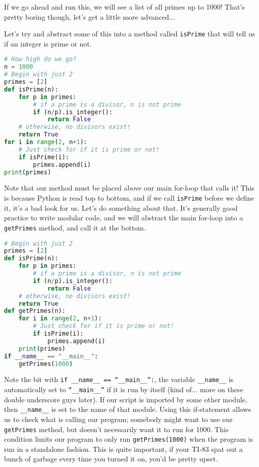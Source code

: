 \documentclass[11pt, twoside, reqno]{book}
\begin{document}
If we go ahead and run this, we will see a list of all primes up to 1000! That's pretty boring though, let's get a little more advanced...

Let's try and abstract some of this into a method called \texttt{isPrime} that will tell us if an integer is prime or not.
\begin{lstlisting}[language=Python]
# How high do we go?
n = 1000
# Begin with just 2
primes = [2]
def isPrime(n):
    for p in primes:
        # if a prime is a divisor, n is not prime
        if (n/p).is_integer():
            return False
    # otherwise, no divisors exist!
    return True
for i in range(2, n+1):
    # Just check for if it is prime or not!
    if isPrime(i):
        primes.append(i)
print(primes)
\end{lstlisting}

Note that our method must be placed above our main for-loop that calls it! This is because Python is read top to bottom, and if we call \texttt{isPrime} before we define it, it's a bad look for us. Let's do something about that. It's generally good practice to write modular code, and we will abstract the main for-loop into a \texttt{getPrimes} method, and call it at the bottom.
\begin{lstlisting}[language=Python]
# Begin with just 2
primes = [2]
def isPrime(n):
    for p in primes:
        # if a prime is a divisor, n is not prime
        if (n/p).is_integer():
            return False
    # otherwise, no divisors exist!
    return True
def getPrimes(n):
    for i in range(2, n+1):
        # Just check for if it is prime or not!
        if isPrime(i):
            primes.append(i)
    print(primes)
if __name__ == "__main__":
    getPrimes(1000)
\end{lstlisting}

Note the bit with \texttt{if \_\_name\_\_ == ``\_\_main\_\_'':}, the variable \texttt{\_\_name\_\_} is automatically set to \texttt{``\_\_main\_\_''} if it is run by itself (kind of... more on these double underscore guys later). If our script is imported by some other module, then \texttt{\_\_name\_\_} is set to the name of that module. Using this if-statement allows us to check what is calling our program; somebody might want to use our \texttt{getPrimes} method, but doesn't necessarily want it to run for 1000. This condition limits our program to only run \texttt{getPrimes(1000)} when the program is run in a standalone fashion. This is quite important, if your TI-83 spat out a bunch of garbage every time you turned it on, you'd be pretty upset.
\end{document}
